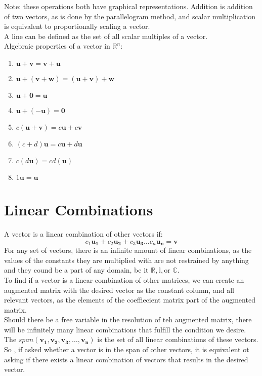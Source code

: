 \documentclass[nobib]{tufte-handout}
\begin{document}
Note: these operations both have graphical representations. Addition is addition of two vectors, as is done by the parallelogram method, and scalar multiplication is equivalent to proportionally scaling a vector.\\
A line can be defined as the set of all scalar multiples of a vector.\\
Algebraic properties of a vector in $\mathbb{R}^n$:
\begin{enumerate}
    \item $\mathbf{u}+\mathbf{v} = \mathbf{v}+\mathbf{u}$
    \item $\mathbf{u} + (\mathbf{v}+\mathbf{w}) = (\mathbf{u}+\mathbf{v})+\mathbf{w}$
    \item $\mathbf{u}+\mathbf{0} = \mathbf{u}$
    \item $\mathbf{u}+(-\mathbf{u})=\mathbf{0}$
    \item $c(\mathbf{u}+\mathbf{v}) = c\mathbf{u}+c\mathbf{v}$
    \item $(c+d)\mathbf{u} = c\mathbf{u}+d\mathbf{u}$
    \item  $c(d\mathbf{u}) = cd(\mathbf{u})$
    \item $1\mathbf{u} = \mathbf{u}$
\end{enumerate}
\section{Linear Combinations}
A vector is a linear combination of other vectors if:
\begin{equation*}
    c_1\mathbf{u_1}+c_2\mathbf{u_2}+c_3\mathbf{u_3} \ldots c_n\mathbf{u_n} = \mathbf{v}
\end{equation*}
For any set of vectors, there is an infinite amount of linear combinations, as the values of the constants they are multiplied with are not restrained by anything and they cound be a part of any domain, be it $\mathbb{R}, \mathbb{I}, \text{or } \mathbb{C}$.\\
To find if a vector is a linear combination of other matrices, we can create an augmented matrix with the desired vector as the constant column, and all relevant vectors, as the elements of the coeffiecient matrix part of the augmented matrix.\\
Should there be a free variable in the resolution of teh augmented matrix, there will be infinitely many linear combinations that fulfill the condition we desire.\\
The $span(\mathbf{v_1}, \mathbf{v_2}, \mathbf{v_3}, \ldots, \mathbf{v_n})$ is the set of all linear combinations of these vectors. So , if asked whether a vector is in the span of other vectors, it is equivalent ot asking if there exists a linear combination of vectors that results in the desired vector.\\
\end{document}
